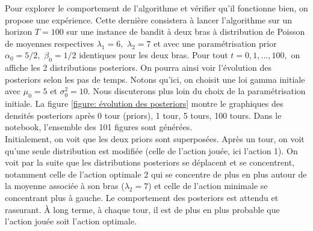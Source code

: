 \documentclass[letterpaper,11pt]{article}
\begin{document}
Pour explorer le comportement de l'algorithme et vérifier qu'il fonctionne bien, on propose une expérience. Cette dernière consistera à lancer l'algorithme sur un horizon $T=100$ sur une instance de bandit à deux bras à distribution de Poisson de moyennes respectives $\lambda_1=6,$ $\lambda_2=7$ et avec une paramétrisation prior $\alpha_0=5/2,$ $\beta_0=1/2$ identiques pour les deux bras. Pour tout $t=0,1,...,100,$ on affiche les 2 distributions posteriors. On pourra ainsi voir l'évolution des posteriors selon les pas de temps. Notons qu'ici, on choisit une loi gamma initiale avec $\mu_0=5$ et $\sigma_0^2=10.$ Nous discuterons plus loin du choix de la paramétrisation initiale. La figure \ref{figure: évolution des posteriors} montre le graphiques des densités posteriors après 0 tour (priors), 1 tour, 5 tours, 100 tours. Dans le notebook, l'ensemble des 101 figures sont générées. \\

Initialement, on voit que les deux priors sont superposées. Après un tour, on voit qu'une seule distribution est modifiée (celle de l'action jouée, ici l'action 1). On voit par la suite que les distributions posteriors se déplacent et se concentrent, notamment celle de l'action optimale 2 qui se concentre de plus en plus autour de la moyenne associée à son bras ($\lambda_2=7$) et celle de l'action minimale se concentrant plus à gauche. Le comportement des posteriors est attendu et rassurant. À long terme, à chaque tour, il est de plus en plus probable que l'action jouée soit l'action optimale. 
\end{document}
